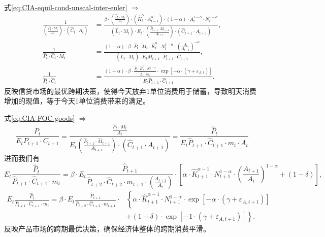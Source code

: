 式\eqref{eq:CIA-equil-cond-unscal-inter-euler} $\Rightarrow$
\begin{align}
  \frac{1}{\left(\frac{\hat{P}_t \cdot M_{t}}{A_t}\right) \cdot \left(\hat{C}_t \cdot A_t \right)} &=
  \frac{
  \beta \cdot \left(\frac{\hat{P}_t \cdot M_t}{A_t}\right) \cdot \left(\hat{K}_t^{\alpha} \cdot A_{t-1}^{\alpha} \right) \cdot (1-\alpha) \cdot A_t^{1-\alpha} \cdot N_t^{1-\alpha}
  }{
  \left(\hat{L}_t \cdot M_t \right) \cdot E_t \cdot \left(\frac{\hat{P}_{t+1} \cdot M_{t+1}}{A_{t+1}}\right) \cdot \left( \hat{C}_{t+1} \cdot A_{t+1} \right)
  },
  \nonumber \\
  \frac{1}{\hat{P}_t \cdot \hat{C}_t \cdot M_t} &= \frac{
  (1-\alpha) \cdot \beta \cdot \hat{P}_t \cdot M_t \cdot \hat{K}_t^{\alpha} \cdot N_t^{1-\alpha} \cdot \left(\frac{A_t}{A_{t-1}}\right)^{-\alpha}
  }{
  \left(\hat{L}_t \cdot M_t\right) \cdot E_t M_{t+1} \cdot \hat{P}_{t+1} \cdot \hat{C}_{t+1}
  },\nonumber \\
  \label{eq:CIA-equil-cond-scal-inter-euler}
  \frac{1}{\hat{P}_t \cdot \hat{C}_t} &=  \frac{
  (1-\alpha)\cdot \beta \cdot \frac{\hat{P}_t \cdot \hat{K}_t^{\alpha} \cdot N_t^{1-\alpha}}{\hat{L}_t \cdot m_t} \cdot \exp \left[ - \alpha \cdot \left( \gamma + \varepsilon_{A,t} \right)\right]
  }{
  E_t \hat{P}_{t+1} \cdot \hat{C}_{t+1}
  }.
\end{align}
反映信贷市场的最优跨期决策，使得今天放弃1单位消费用于储蓄，导致明天消费增加的现值，等于今天1单位消费带来的满足。

式\eqref{eq:CIA-FOC-goods} $\Rightarrow$
\begin{equation*}
  \frac{P_t}{E_t P_{t+1}\cdot C_{t+1}}
  = \frac{
  \frac{\hat{P}_t \cdot M_t }{A_t}
  }{
  E_t \left(
   \frac{\hat{P}_{t+1} \cdot \hat{M}_{t+1}}{A_{t+1}}
  \right) \cdot \left(
  \hat{C}_{t+1} \cdot A_{t+1}
  \right)
  }
  =\frac{\hat{P}_t}{E_t \hat{P}_{t+1} \cdot \hat{C}_{t+1} \cdot m_t \cdot A_t}
\end{equation*}
进而我们有
\begin{equation*}
  E_t \frac{\hat{P}_t}{\hat{P}_{t+1} \cdot \hat{C}_{t+1} \cdot m_t} = \beta \cdot E_t \frac{\hat{P}_{t+1}}{\hat{P}_{t+2} \cdot \hat{C}_{t+2} \cdot m_{t+1} \cdot \left(\frac{A_{t+1}}{A_t}\right)} \cdot \left[
  \alpha \cdot \hat{K}_{t+1}^{\alpha-1} \cdot N_{t+1}^{1-\alpha} \cdot
  \left(\frac{A_{t+1}}{A_t}\right)^{1-\alpha} + \left( 1-\delta \right)
  \right],
\end{equation*}
\begin{align}
  \label{eq:CIA-FOC-goods-scal}
 E_t \frac{\hat{P}_t}{\hat{P}_{t+1} \cdot \hat{C}_{t+1} \cdot m_t} = \beta \cdot E_t \frac{
 \hat{P}_{t+1}
 }{
 \hat{P}_{t+2} \cdot \hat{C}_{t+2} \cdot m_{t+1}
 } \cdot & \left\{
\alpha \cdot \hat{K}_{t+1}^{\alpha -1} \cdot N_{t+1}^{ 1-\alpha} \cdot \exp \left[-\alpha \cdot \left(\gamma + \varepsilon_{A,t+1}\right)\right] \right.\nonumber \\
& \left. + \left( 1-\delta \right) \cdot \exp \left[ -1 \cdot \left( \gamma + \varepsilon_{A,t+1} \right) \right] \right\}.
\end{align}
反映产品市场的跨期最优决策，确保经济体整体的跨期消费平滑。

